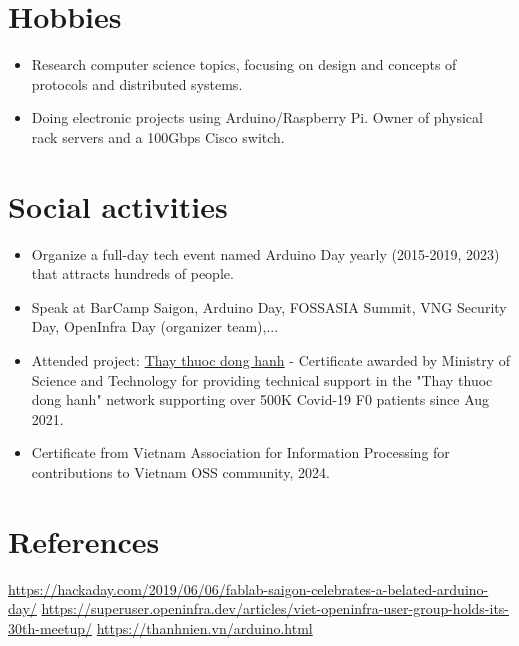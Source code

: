 \documentclass[letterpaper,11pt]{article}
\newcommand{\resumeItemNornal}[1]{
  \item\small{
    {#1 \vspace{-2pt}}
  }
}
\newcommand{\resumeSubItemNormal}[1]{\resumeItemNornal{#1}\vspace{-4pt}}
\newcommand{\resumeSubHeadingListStart}{\begin{itemize}[leftmargin=*]}
\newcommand{\resumeSubHeadingListEnd}{\end{itemize}}
\begin{document}
\section{Hobbies}
  \resumeSubHeadingListStart
    \resumeSubItemNormal
      {Research computer science topics, focusing on design and concepts of protocols and distributed systems.}
  \resumeSubItemNormal
      {Doing electronic projects using Arduino/Raspberry Pi. Owner of physical rack servers and a 100Gbps Cisco switch.}
\resumeSubHeadingListEnd

\section{Social activities}
  \resumeSubHeadingListStart
    \resumeSubItemNormal
      {Organize a full-day tech event named Arduino Day yearly (2015-2019, 2023) that attracts hundreds of people.}
    \resumeSubItemNormal
      {Speak at BarCamp Saigon, Arduino Day, FOSSASIA Summit, VNG Security Day, OpenInfra Day (organizer team),...}
    \resumeSubItemNormal
      {Attended project: \href{https://thaythuocdonghanh.vn}{Thay thuoc dong hanh} - Certificate awarded by Ministry of Science and Technology for providing technical support in the "Thay thuoc dong hanh" network supporting over 500K Covid-19 F0 patients since Aug 2021.}
    \resumeSubItemNormal
    {Certificate from Vietnam Association for Information Processing for contributions to Vietnam OSS community, 2024.}
\resumeSubHeadingListEnd

\section{References}
    \small{\href{https://hackaday.com/2019/06/06/fablab-saigon-celebrates-a-belated-arduino-day/}{https://hackaday.com/2019/06/06/fablab-saigon-celebrates-a-belated-arduino-day/}}
    \small{\href{https://superuser.openinfra.dev/articles/viet-openinfra-user-group-holds-its-30th-meetup/}{https://superuser.openinfra.dev/articles/viet-openinfra-user-group-holds-its-30th-meetup/}}\newline
    \small{\href{https://thanhnien.vn/vi-sao-nhieu-nguoi-me-arduino-nen-tang-duoc-cho-la-tien-than-cua-giao-duc-stem-185230704165819482.htm}{https://thanhnien.vn/arduino.html}}
   
\end{document}
